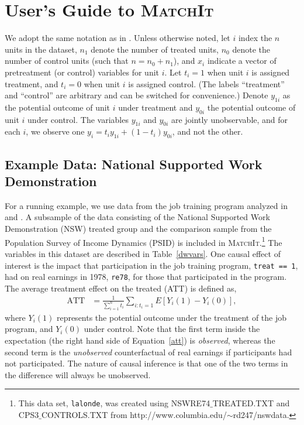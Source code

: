 \documentclass[oneside,letterpaper,titlepage]{article}
\newcommand{\MatchIt}{\textsc{MatchIt}}
\begin{document}
\section{User's Guide to \MatchIt}
\label{methods}

We adopt the same notation as in \citet*{HoImaKin05}. Unless otherwise
noted, let $i$ index the $n$ units in the dataset, $n_1$ denote the
number of treated units, $n_0$ denote the number of control units
(such that $n=n_0+n_1$), and $x_i$ indicate a vector of pretreatment
(or control) variables for unit $i$.  Let $t_i=1$ when unit $i$ is
assigned treatment, and $t_i=0$ when unit $i$ is assigned control.
(The labels ``treatment'' and ``control'' are arbitrary and can be
switched for convenience.)  Denote $y_{1i}$ as the potential outcome
of unit $i$ under treatment and $y_{0i}$ the potential outcome of unit
$i$ under control.  The variables $y_{1i}$ and $y_{0i}$ are jointly
unobservable, and for each $i$, we observe one
$y_i=t_iy_{1i}+(1-t_i)y_{0i}$, and not the other.


\subsection{Example Data: National Supported Work Demonstration}
\label{subsec:lalonde}

For a running example, we use data from the job training program
analyzed in \citet{lalonde86} and \citet{DehWah99}.  A subsample of
the data consisting of the National Supported Work Demonstration (NSW)
treated group and the comparison sample from the Population Survey of
Income Dynamics (PSID) is included in \MatchIt.\footnote{This data
set, \texttt{lalonde}, was created using NSWRE74$\_$TREATED.TXT and
CPS3$\_$CONTROLS.TXT from
http://www.columbia.edu/$\sim$rd247/nswdata.}  The variables in this
dataset are described in Table~\ref{dwvars}.  One causal effect of
interest is the impact that participation in the job training program,
\texttt{treat == 1}, had on real earnings in 1978, \texttt{re78}, for
those that participated in the program.  The average treatment effect
on the treated (ATT) is defined as, 
\begin{align}
  \label{att}
  \text{ATT} & = \frac{1}{\sum_{i=1}^n t_i}\sum_{i:t_i=1} E[Y_i(1) - Y_i(0)],
\end{align}
where $Y_i(1)$ represents the potential outcome under the treatment of
the job program, and $Y_i(0)$ under control.  Note that the first term
inside the expectation (the right hand side of Equation~\ref{att}) is
\emph{observed}, whereas the second term is the \emph{unobserved}
counterfactual of real earnings if participants had not participated.
The nature of causal inference is that one of the two terms in the
difference will always be unobserved.  
\end{document}
